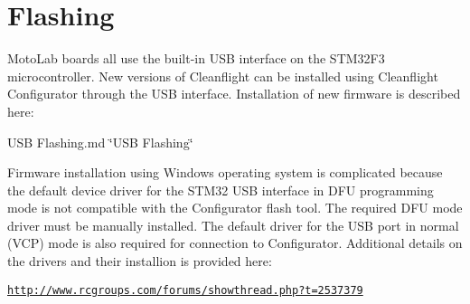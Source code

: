 \section*{Flashing}

Moto\+Lab boards all use the built-\/in U\+S\+B interface on the S\+T\+M32\+F3 microcontroller. New versions of Cleanflight can be installed using Cleanflight Configurator through the U\+S\+B interface. Installation of new firmware is described here\+:

U\+S\+B Flashing.\+md \char`\"{}\+U\+S\+B Flashing\char`\"{}

Firmware installation using Windows operating system is complicated because the default device driver for the S\+T\+M32 U\+S\+B interface in D\+F\+U programming mode is not compatible with the Configurator flash tool. The required D\+F\+U mode driver must be manually installed. The default driver for the U\+S\+B port in normal (V\+C\+P) mode is also required for connection to Configurator. Additional details on the drivers and their installion is provided here\+:

\href{http://www.rcgroups.com/forums/showthread.php?t=2537379}{\tt http\+://www.\+rcgroups.\+com/forums/showthread.\+php?t=2537379} 